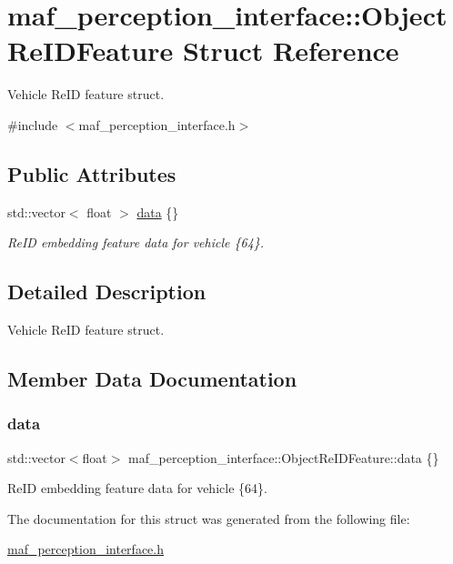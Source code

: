 \hypertarget{structmaf__perception__interface_1_1ObjectReIDFeature}{}\section{maf\+\_\+perception\+\_\+interface\+:\+:Object\+Re\+I\+D\+Feature Struct Reference}
\label{structmaf__perception__interface_1_1ObjectReIDFeature}


Vehicle Re\+ID feature struct.  




{\ttfamily \#include $<$maf\+\_\+perception\+\_\+interface.\+h$>$}

\subsection*{Public Attributes}
\begin{DoxyCompactItemize}
\item 
std\+::vector$<$ float $>$ \hyperlink{structmaf__perception__interface_1_1ObjectReIDFeature_a1b900aecb62412660c7e1457a57cbd64}{data} \{\}
\begin{DoxyCompactList}\small\item\em Re\+ID embedding feature data for vehicle \{64\}. \end{DoxyCompactList}\end{DoxyCompactItemize}


\subsection{Detailed Description}
Vehicle Re\+ID feature struct. 

\subsection{Member Data Documentation}
\mbox{\label{structmaf__perception__interface_1_1ObjectReIDFeature_a1b900aecb62412660c7e1457a57cbd64}} 
\subsubsection{\texorpdfstring{data}{data}}
{\footnotesize\ttfamily std\+::vector$<$float$>$ maf\+\_\+perception\+\_\+interface\+::\+Object\+Re\+I\+D\+Feature\+::data \{\}}



Re\+ID embedding feature data for vehicle \{64\}. 



The documentation for this struct was generated from the following file\+:\begin{DoxyCompactItemize}
\item 
\hyperlink{maf__perception__interface_8h}{maf\+\_\+perception\+\_\+interface.\+h}\end{DoxyCompactItemize}
